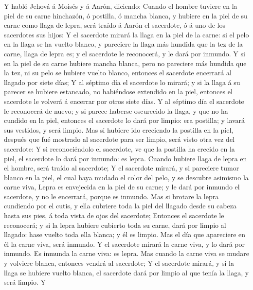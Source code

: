  Y habló Jehová á Moisés y á Aarón, diciendo:
 Cuando el hombre tuviere en la piel de su carne
hinchazón, ó postilla, ó mancha blanca, y hubiere en la piel de su carne
como llaga de lepra, será traído á Aarón el sacerdote, ó á uno de los
sacerdotes sus hijos:  Y el sacerdote mirará la llaga en
la piel de la carne: si el pelo en la llaga se ha vuelto blanco, y
pareciere la llaga más hundida que la tez de la carne, llaga de lepra
es; y el sacerdote le reconocerá, y le dará por inmundo. 
Y si en la piel de su carne hubiere mancha blanca, pero no pareciere más
hundida que la tez, ni su pelo se hubiere vuelto blanco, entonces el
sacerdote encerrará al llagado por siete días;  Y al
séptimo día el sacerdote lo mirará; y si la llaga á su parecer se
hubiere estancado, no habiéndose extendido en la piel, entonces el
sacerdote le volverá á encerrar por otros siete días.  Y
al séptimo día el sacerdote le reconocerá de nuevo; y si parece haberse
oscurecido la llaga, y que no ha cundido en la piel, entonces el
sacerdote lo dará por limpio: era postilla; y lavará sus vestidos, y
será limpio.  Mas si hubiere ido creciendo la postilla en
la piel, después que fué mostrado al sacerdote para ser limpio, será
visto otra vez del sacerdote:  Y si reconociéndolo el
sacerdote, ve que la postilla ha crecido en la piel, el sacerdote lo
dará por inmundo: es lepra.  Cuando hubiere llaga de lepra
en el hombre, será traído al sacerdote;  Y el sacerdote
mirará, y si pareciere tumor blanco en la piel, el cual haya mudado el
color del pelo, y se descubre asimismo la carne viva, 
Lepra es envejecida en la piel de su carne; y le dará por inmundo el
sacerdote, y no le encerrará, porque es inmundo.  Mas si
brotare la lepra cundiendo por el cutis, y ella cubriere toda la piel
del llagado desde su cabeza hasta sus pies, á toda vista de ojos del
sacerdote;  Entonces el sacerdote le reconocerá; y si la
lepra hubiere cubierto toda su carne, dará por limpio al llagado: hase
vuelto toda ella blanca; y él es limpio.  Mas el día que
apareciere en él la carne viva, será inmundo.  Y el
sacerdote mirará la carne viva, y lo dará por inmundo. Es inmunda la
carne viva: es lepra.  Mas cuando la carne viva se mudare
y volviere blanca, entonces vendrá al sacerdote;  Y el
sacerdote mirará, y si la llaga se hubiere vuelto blanca, el sacerdote
dará por limpio al que tenía la llaga, y será limpio.  Y
